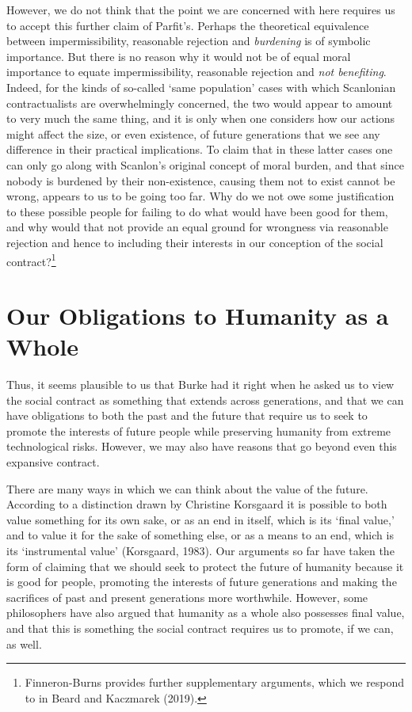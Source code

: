 \documentclass[man,11pt,a4paper]{apa7}
\begin{document}
However, we do not think that the point we are concerned with here requires us to accept this further claim of Parfit's. Perhaps the theoretical equivalence between impermissibility, reasonable rejection and \textit{burdening} is of symbolic importance. But there is no reason why it would not be of equal moral importance to equate impermissibility, reasonable rejection and \textit{not benefiting}. Indeed, for the kinds of so-called `same population' cases with which Scanlonian contractualists are overwhelmingly concerned, the two would appear to amount to very much the same thing, and it is only when one considers how our actions might affect the size, or even existence, of future generations that we see any difference in their practical implications. To claim that in these latter cases one can only go along with Scanlon's original concept of moral burden, and that since nobody is burdened by their non-existence, causing them not to exist cannot be wrong, appears to us to be going too far. Why do we not owe some justification to these possible people for failing to do what would have been good for them, and why would that not provide an equal ground for wrongness via reasonable rejection and hence to including their interests in our conception of the social contract?\footnote{Finneron-Burns provides further supplementary arguments, which we respond to in Beard and Kaczmarek (2019).}

\section{Our Obligations to Humanity as a Whole}

Thus, it seems plausible to us that Burke had it right when he asked us to view the social contract as something that extends across generations, and that we can have obligations to both the past and the future that require us to seek to promote the interests of future people while preserving humanity from extreme technological risks. However, we may also have reasons that go beyond even this expansive contract.

There are many ways in which we can think about the value of the future. According to a distinction drawn by Christine Korsgaard it is possible to both value something for its own sake, or as an end in itself, which is its `final value,' and to value it for the sake of something else, or as a means to an end, which is its `instrumental value' (Korsgaard, 1983). Our arguments so far have taken the form of claiming that we should seek to protect the future of humanity because it is good for people, promoting the interests of future generations and making the sacrifices of past and present generations more worthwhile. However, some philosophers have also argued that humanity as a whole also possesses final value, and that this is something the social contract requires us to promote, if we can, as well.
\end{document}
